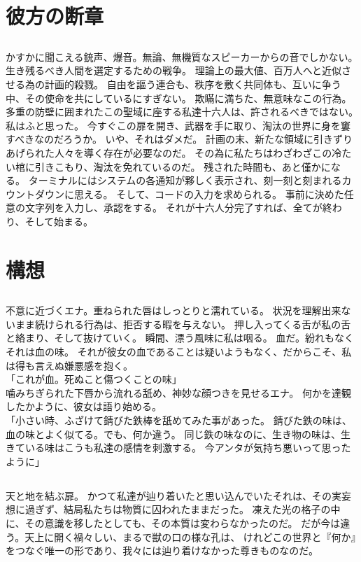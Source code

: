\documentclass[autodetect-engine,dvipdfmx-if-dvi,a5paper,ja=standard,twoside,titlepage,final,twocolumn]{ltjtbook}
\begin{document}
\chapter{\rm 彼方の断章}
\section{}
かすかに聞こえる銃声、爆音。無論、無機質なスピーカーからの音でしかない。
生き残るべき人間を選定するための戦争。
理論上の最大値、百万人へと近似させる為の計画的殺戮。
自由を謳う連合も、秩序を敷く共同体も、互いに争う中、その使命を共にしているにすぎない。
欺瞞に満ちた、無意味なこの行為。
多重の防壁に囲まれたこの聖域に座する私達十六人は、許されるべきではない。
私はふと思った。
今すぐこの扉を開き、武器を手に取り、淘汰の世界に身を窶すべきなのだろうか。
いや、それはダメだ。
計画の末、新たな領域に引きずりあげられた人々を導く存在が必要なのだ。
その為に私たちはわざわざこの冷たい棺に引きこもり、淘汰を免れているのだ。
残された時間も、あと僅かになる。
ターミナルにはシステムの各通知が夥しく表示され、刻一刻と刻まれるカウントダウンに思える。
そして、コードの入力を求められる。
事前に決めた任意の文字列を入力し、承認をする。
それが十六人分完了すれば、全てが終わり、そして始まる。

\chapter{\rm 構想}
\section{}
不意に近づくエナ。重ねられた唇はしっとりと濡れている。
状況を理解出来ないまま続けられる行為は、拒否する暇を与えない。
押し入ってくる舌が私の舌と絡まり、そして抜けていく。
瞬間、漂う風味に私は咽る。
血だ。紛れもなくそれは血の味。
それが彼女の血であることは疑いようもなく、だからこそ、私は得も言えぬ嫌悪感を抱く。\\
「これが血。死ぬこと傷つくことの味」\\
噛みちぎられた下唇から流れる舐め、神妙な顔つきを見せるエナ。
何かを達観したかように、彼女は語り始める。\\
「小さい時、ふざけて錆びた鉄棒を舐めてみた事があった。
錆びた鉄の味は、血の味とよく似てる。でも、何か違う。
同じ鉄の味なのに、生き物の味は、生きている味はこうも私達の感情を刺激する。
今アンタが気持ち悪いって思ったように」

\section{}
天と地を結ぶ扉。
かつて私達が辿り着いたと思い込んでいたそれは、その実妄想に過ぎず、結局私たちは物質に囚われたままだった。
凍えた光の格子の中に、その意識を移したとしても、その本質は変わらなかったのだ。
だが今は違う。天上に開く禍々しい、まるで獣の口の様な孔は、
けれどこの世界と『何か』をつなぐ唯一の形であり、我々には辿り着けなかった尊きものなのだ。
\end{document}
